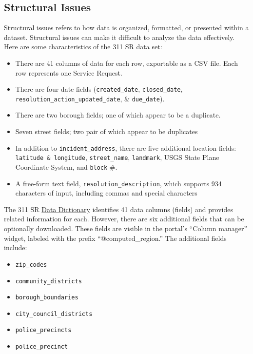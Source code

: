 \documentclass[linenumber]{jdsart}
\begin{document}
\subsection{Structural Issues}
\label{sec:structural}

Structural issues refers to how data is organized, formatted, 
or presented within a dataset. Structural issues can make 
it difficult to analyze the data effectively. Here are some 
characteristics of the 311 SR data set:

\begin{itemize}
	\item There are 41 columns of data for each row, exportable as a CSV file.
	Each row represents one Service Request. 
	
	\item There are four date fields 
	(\texttt{created\_date}, \texttt{closed\_date}, \texttt{resolution\_action\_updated\_date}, \& \texttt{due\_date}).
	
	\item There are two borough fields; one of which appear to be a duplicate.
		
	\item Seven street fields; two pair of which appear to be duplicates
	
	\item In addition to  \texttt{incident\_address}, there are five additional location fields: 
	\texttt{latitude \& longitude}, \texttt{street\_name}, \texttt{landmark}, USGS State Plane 
	Coordinate System, and \texttt{block} \#.
	
	\item A free-form text field, \texttt{resolution\_description}, which 
	supports 934 characters of input, including commas and special characters
\end{itemize}

The 311 SR 
\href{https://data.cityofnewyork.us/api/views/erm2-nwe9/files/b372b884-f86a-453b-ba16-1fe06ce9d212?download=true&filename=311_ServiceRequest_2010-Present_DataDictionary_Updated_2023.xlsx}{Data Dictionary} 
identifies 41 data columns (fields) and provides related information 
for each. However, there are six additional fields that can be
optionally downloaded. These fields are 
visible in the portal's ``Column manager'' widget, labeled with the prefix 
``@computed\_region.'' The additional fields include:

\begin{itemize}
    \item \texttt{zip\_codes}
    \item \texttt{community\_districts}
    \item \texttt{borough\_boundaries}
    \item \texttt{city\_council\_districts}
    \item \texttt{police\_precincts}
    \item \texttt{police\_precinct}
\end{itemize}
\end{document}
